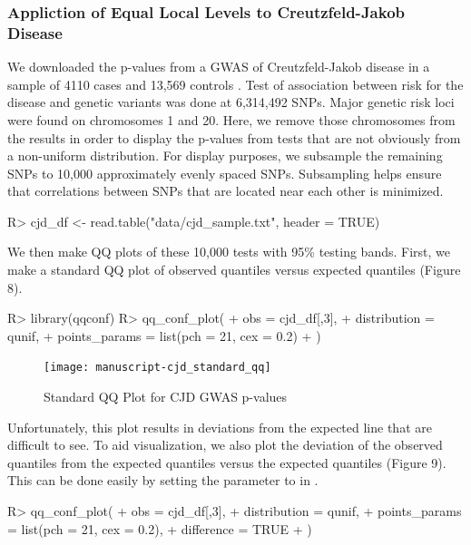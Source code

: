 \documentclass[article]{jss}
\begin{document}
\subsubsection{Appliction of Equal Local Levels to Creutzfeld-Jakob Disease}
We downloaded the p-values from a GWAS of Creutzfeld-Jakob disease in a sample of 4110 cases and 13,569 controls \citep{jones2020identification}. Test of association between risk for the disease and genetic variants was done at 6,314,492 SNPs. Major genetic risk loci were found on chromosomes 1 and 20. Here, we remove those chromosomes from the results in order to display the p-values from tests that are not obviously from a non-uniform distribution. For display purposes, we subsample the remaining SNPs to 10,000 approximately evenly spaced SNPs. Subsampling helps ensure that correlations between SNPs that are located
near each other is minimized.
\begin{Schunk}
\begin{Sinput}
R> cjd_df <- read.table("data/cjd_sample.txt", header = TRUE)
\end{Sinput}
\end{Schunk}
We then make QQ plots of these 10,000 tests with 95\% testing bands. First, we make a standard QQ plot of observed quantiles versus expected quantiles (Figure 8).
\begin{Schunk}
\begin{Sinput}
R> library(qqconf)
R> qq_conf_plot(
+    obs = cjd_df[,3],
+    distribution = qunif,
+    points_params = list(pch = 21, cex = 0.2)
+    )
\end{Sinput}
\end{Schunk}

\begin{figure}
\begin{center}
\texttt{[image: manuscript-cjd\_standard\_qq]}
\end{center}
\caption{Standard QQ Plot for CJD GWAS p-values}
\end{figure}

Unfortunately, this plot results in deviations from the expected line that are difficult to see. To aid visualization, we also plot the deviation of the observed quantiles from the expected quantiles versus the expected quantiles (Figure 9). This can be done easily by setting the  parameter to  in .
\begin{Schunk}
\begin{Sinput}
R> qq_conf_plot(
+    obs = cjd_df[,3],
+    distribution = qunif,
+    points_params = list(pch = 21, cex = 0.2),
+    difference = TRUE
+    )
\end{Sinput}
\end{Schunk}
\end{document}
